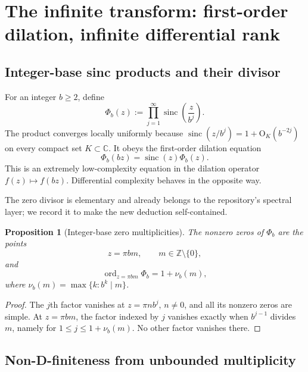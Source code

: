 \documentclass[11pt]{article}
\numberwithin{equation}{section}
\newtheorem{proposition}[theorem]{Proposition}
\theoremstyle{definition}
\theoremstyle{remark}
\DeclareMathOperator{\ord}{ord}
\newcommand{\C}{\mathbb C}
\newcommand{\Z}{\mathbb Z}
\newcommand{\Oh}{\mathrm O}
\newcommand{\sinc}{\operatorname{sinc}}
\begin{document}
\section{The infinite transform: first-order dilation, infinite differential rank}
\label{sec:infinite-nonholonomic}

\subsection{Integer-base sinc products and their divisor}

For an integer $b\ge2$, define
\begin{equation}
 \Phi_b(z):=\prod_{j=1}^{\infty}\sinc\!\left(\frac{z}{b^j}\right).
 \label{eq:base-b-product}
\end{equation}
The product converges locally uniformly because
$\sinc(z/b^j)=1+\Oh_K(b^{-2j})$ on every compact set $K\subset\C$.  It obeys
the first-order dilation equation
\begin{equation}
 \boxed{\Phi_b(bz)=\sinc(z)\Phi_b(z).}
 \label{eq:first-order-dilation}
\end{equation}
This is an extremely low-complexity equation in the dilation operator
$f(z)\mapsto f(bz)$.  Differential complexity behaves in the opposite way.

The zero divisor is elementary and already belongs to the repository's
spectral layer; we record it to make the new deduction self-contained.

\begin{proposition}[Integer-base zero multiplicities]
\label{prop:base-b-zeros}
The nonzero zeros of $\Phi_b$ are the points
\begin{equation}
 z=\pi bm,
 \qquad m\in\Z\setminus\{0\},
 \label{eq:base-b-zero-lattice}
\end{equation}
and
\begin{equation}
 \ord_{z=\pi bm}\Phi_b=1+\nu_b(m),
 \label{eq:base-b-zero-order}
\end{equation}
where $\nu_b(m)=\max\{k:b^k\mid m\}$.
\end{proposition}
\begin{proof}
The $j$th factor vanishes at $z=\pi nb^j$, $n\ne0$, and all its nonzero zeros
are simple.  At $z=\pi bm$, the factor indexed by $j$ vanishes exactly when
$b^{j-1}$ divides $m$, namely for
$1\le j\le1+\nu_b(m)$.  No other factor vanishes there.
\end{proof}

\subsection{Non-D-finiteness from unbounded multiplicity}
\end{document}
